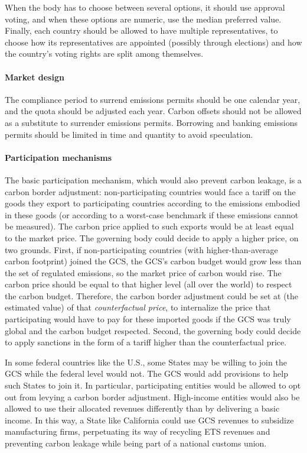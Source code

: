 \documentclass[12pt,english]{article}
\begin{document}
When the body has to choose between several options, it should use approval voting, and when these options are numeric, use the median preferred value. Finally, each country should be allowed to have multiple representatives, to choose how its representatives are appointed (possibly through elections) and how the country's voting rights are split among themselves. 

\paragraph{Market design} 
The compliance period to surrend emissions permits should be one calendar year, and the quota should be adjusted each year. Carbon offsets should not be allowed as a substitute to surrender emissions permits. Borrowing and banking emissions permits should be limited in time and quantity to avoid speculation. 

\paragraph{Participation mechanisms}

The basic participation mechanism, which would also prevent carbon leakage, is a carbon border adjustment: non-participating countries would face a tariff on the goods they export to participating countries according to the emissions embodied in these goods (or according to a worst-case benchmark if these emissions cannot be measured). The carbon price applied to such exports would be at least equal to the market price. The governing body could decide to apply a higher price, on two grounds. First, if non-participating countries (with higher-than-average carbon footprint) joined the GCS, the GCS's carbon budget would grow less than the set of regulated emissions, so the market price of carbon would rise. The carbon price should be equal to that higher level (all over the world) to respect the carbon budget. Therefore, the carbon border adjustment could be set at (the estimated value) of that \textit{counterfactual price}, to internalize the price that participating would have to pay for these imported goods if the GCS was truly global and the carbon budget respected. Second, the governing body could decide to apply sanctions in the form of a tariff higher than the counterfactual price. 

In some federal countries like the U.S., some States may be willing to join the GCS while the federal level would not. The GCS would add provisions to help such States to join it. In particular, participating entities would be allowed to opt out from levying a carbon border adjustment. High-income entities would also be allowed to use their allocated revenues differently than by delivering a basic income. In this way, a State like California could use GCS revenues to subsidize manufacturing firms, perpetuating its way of recycling ETS revenues and preventing carbon leakage while being part of a national customs union. 
\end{document}
